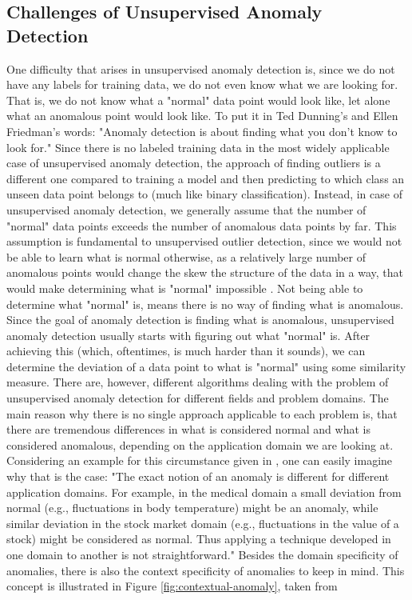 \documentclass{vldb}
\begin{document}
\subsection{Challenges of Unsupervised Anomaly Detection}
\label{subsec:Intro-challenges}
One difficulty that arises in unsupervised anomaly detection is, since we do not have any labels for training data, we do not even know what we are looking for. That is, we do not know what a "normal" data point would look like, let alone what an anomalous point would look like. To put it in Ted Dunning's and Ellen Friedman's words: "Anomaly detection is about finding what you don't know to look for." \cite{book:mapr} 
Since there is no labeled training data in the most widely applicable case of unsupervised anomaly detection, the approach of finding outliers is a different one compared to training a model and then predicting to which class an unseen data point belongs to (much like binary classification). Instead, in case of unsupervised anomaly detection, we generally assume that the number of "normal" data points exceeds the number of anomalous data points by far.\cite{survey:anomaly-detection} This assumption is fundamental to unsupervised outlier detection, since we would not be able to learn what is normal otherwise, as a relatively large number of anomalous points would change the skew the structure of the data in a way, that would make determining what is "normal" impossible . Not being able to determine what "normal" is, means there is no way of finding what is anomalous. Since the goal of anomaly detection is finding what is anomalous, unsupervised anomaly detection usually starts with figuring out what "normal" is. After achieving this (which, oftentimes, is much harder than it sounds), we can determine the deviation of a data point to what is "normal" using some similarity measure. There are, however, different algorithms dealing with the problem of unsupervised anomaly detection for different fields and problem domains. The main reason why there is no single approach applicable to each problem is, that there are tremendous differences in what is considered normal and what is considered anomalous, depending on the application domain we are looking at. Considering an example for this circumstance given in \cite{survey:anomaly-detection}, one can easily imagine why that is the case: "The exact notion of an anomaly is different for different application domains. For example, in the medical domain a small deviation from normal (e.g., fluctuations in body temperature) might be an anomaly, while similar deviation in the stock market domain (e.g., fluctuations in the value of a stock) might be considered as normal. Thus applying a technique developed in one domain to another is not straightforward." Besides the domain specificity of anomalies, there is also the context specificity of anomalies to keep in mind. This concept is illustrated in Figure \ref{fig:contextual-anomaly}, taken from \cite{book:mapr}
\end{document}
